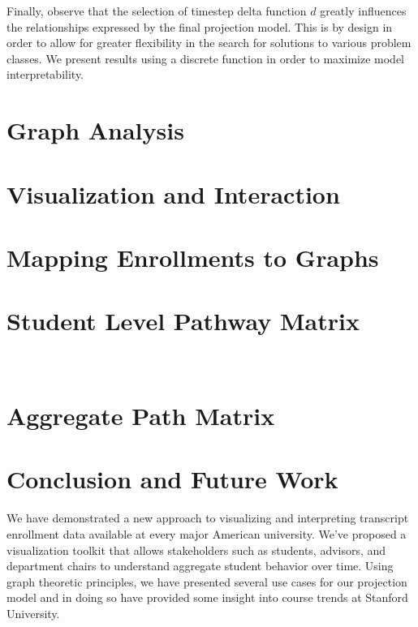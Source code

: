 \documentclass{sigchi}
\begin{document}
Finally, observe that the selection of timestep delta function $d$ greatly influences the relationships expressed by the final projection model. This is by design in order to allow for greater flexibility in the search for solutions to various problem classes. We present results using a discrete function in order to maximize model interpretability.

\section{Graph Analysis} 


\section{Visualization and Interaction}
\label{sec:visualization}

\section{Mapping Enrollments to Graphs}
\label{sec:mapping}

\section{Student Level Pathway Matrix}\
\label{sec:stud_matrix}

\section{Aggregate Path Matrix}
\label{sec:aggr_matrix}


\section{Conclusion and Future Work}
\label{sec:conclusion}
We have demonstrated a new approach to visualizing and interpreting transcript enrollment data available at every major American university. We've proposed a visualization toolkit that allows stakeholders such as students, advisors, and department chairs to understand aggregate student behavior over time. Using graph theoretic principles, we have presented several use cases for our projection model and in doing so have provided some insight into course trends at Stanford University.
\end{document}
